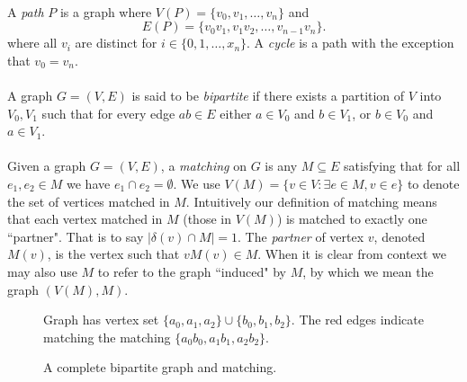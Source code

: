 \paragraph{}
A {\it path} $P$ is a graph where  $V(P) = \{v_0, v_1, \dots, v_n\}$ and 
$$E(P) = \{v_0v_1, v_1v_2, \dots, v_{n-1}v_n\}.$$
where all $v_i$ are distinct for $i \in \{0,1,\dots,x_n\}$. A {\it cycle} is a path with the exception that $v_0 = v_n$.

\paragraph{} A graph $G = (V,E)$ is said to be {\it bipartite} if there exists a partition of $V$ into $V_0, V_1$ such that for every edge $ab \in E$ either $a \in V_0$ and $b \in V_1$, or $b \in V_0$ and $a \in V_1$. 

\paragraph{} Given a graph $G = (V,E)$, a {\it matching} on $G$ is any $M \subseteq E$ satisfying that for all $e_1, e_2 \in M$ we have $e_1 \cap e_2 = \emptyset$. We use $V(M) = \{v \in V: \exists e \in M, v \in e\}$ to denote the set of vertices matched in $M$. Intuitively our definition of matching means that each vertex matched in $M$ (those in $V(M)$) is matched to exactly one ``partner". That is to say $|\delta(v) \cap M| = 1$. The {\it partner} of vertex $v$, denoted $M(v)$, is the vertex such that $vM(v) \in M$. When it is clear from context we may also use $M$ to refer to the graph ``induced" by $M$, by which we mean the graph $(V(M), M)$.

\begin{figure}[h]
\centering
{}
\caption{A complete bipartite graph and matching.}
\small
\begin{flushleft}
 Graph has vertex set $\{a_0,a_1, a_2\} \cup \{b_0,b_1,b_2\}$. The red edges indicate matching the matching $\{a_0b_0, a_1b_1, a_2b_2\}$.
\end{flushleft}
\end{figure}

